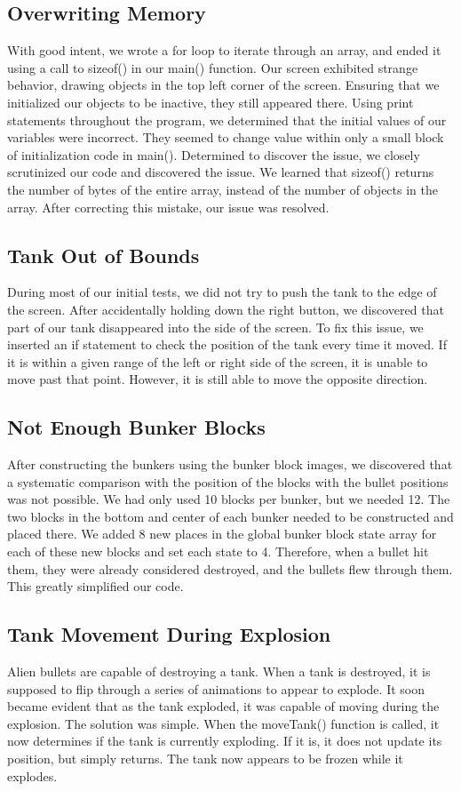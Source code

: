 \documentclass[11pt,letter,oneside]{report}
\begin{document}
\subsection{Overwriting Memory}
With good intent, we wrote a for loop to iterate through an array, and ended it using a call to sizeof() in our main() function. Our screen exhibited strange behavior, drawing objects in the top left corner of the screen. Ensuring that we initialized our objects to be inactive, they still appeared there. Using print statements throughout the program, we determined that the initial values of our variables were incorrect. They seemed to change value within only a small block of initialization code in main(). Determined to discover the issue, we closely scrutinized our code and discovered the issue. We learned that sizeof() returns the number of bytes of the entire array, instead of the number of objects in the array. After correcting this mistake, our issue was resolved.


\subsection{Tank Out of Bounds}
During most of our initial tests, we did not try to push the tank to the edge of the screen. After accidentally holding down the right button, we discovered that part of our tank disappeared into the side of the screen. To fix this issue, we inserted an if statement to check the position of the tank every time it moved. If it is within a given range of the left or right side of the screen, it is unable to move past that point. However, it is still able to move the opposite direction.

\subsection{Not Enough Bunker Blocks}
After constructing the bunkers using the bunker block images, we discovered that a systematic comparison with the position of the blocks with the bullet positions was not possible. We had only used 10 blocks per bunker, but we needed 12. The two blocks in the bottom and center of each bunker needed to be constructed and placed there. We added 8 new places in the global bunker block state array for each of these new blocks and set each state to 4. Therefore, when a bullet hit them, they were already considered destroyed, and the bullets flew through them. This greatly simplified our code.

\subsection{Tank Movement During Explosion}
Alien bullets are capable of destroying a tank. When a tank is destroyed, it is supposed to flip through a series of animations to appear to explode. It soon became evident that as the tank exploded, it was capable of moving during the explosion. The solution was simple. When the moveTank() function is called, it now determines if the tank is currently exploding. If it is, it does not update its position, but simply returns. The tank now appears to be frozen while it explodes.
\end{document}
